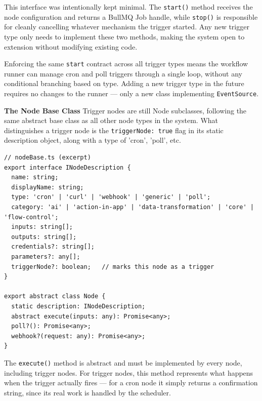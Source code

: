 This interface was intentionally kept minimal. The \texttt{start()} method receives the node configuration and returns a BullMQ Job handle, while \texttt{stop()} is responsible for cleanly cancelling whatever mechanism the trigger started. Any new trigger type only needs to implement these two methods, making the system open to extension without modifying existing code.
 
Enforcing the same \texttt{start} contract across all trigger types means the workflow runner can manage cron and poll triggers through a single loop, without any conditional branching based on type. Adding a new trigger type in the future requires no changes to the runner --- only a new class implementing \texttt{EventSource}.

\textbf{The Node Base Class}
Trigger nodes are still Node subclasses, following the same abstract base class as all other node types in the system. What distinguishes a trigger node is the \texttt{triggerNode: true} flag in its static description object, along with a type of 'cron', 'poll', etc.

\begin{lstlisting}
// nodeBase.ts (excerpt)
export interface INodeDescription {
  name: string;
  displayName: string;
  type: 'cron' | 'curl' | 'webhook' | 'generic' | 'poll';
  category: 'ai' | 'action-in-app' | 'data-transformation' | 'core' | 'flow-control';
  inputs: string[];
  outputs: string[];
  credentials?: string[];
  parameters?: any[];
  triggerNode?: boolean;   // marks this node as a trigger
}
 
export abstract class Node {
  static description: INodeDescription;
  abstract execute(inputs: any): Promise<any>;
  poll?(): Promise<any>;
  webhook?(request: any): Promise<any>;
}
\end{lstlisting}

The \texttt{execute()} method is abstract and must be implemented by every node, including trigger nodes. For trigger nodes, this method represents what happens when the trigger actually fires — for a cron node it simply returns a confirmation string, since its real work is handled by the scheduler.
